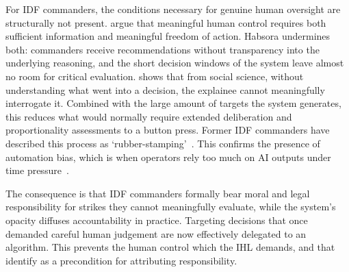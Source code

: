 For IDF commanders, the conditions necessary for genuine human oversight are structurally not present. \citet{mhcof} argue that meaningful human control requires both sufficient information and meaningful freedom of action. Habsora undermines both: commanders receive recommendations without transparency into the underlying reasoning, and the short decision windows of the system leave almost no room for critical evaluation. \citet{miller2018explanationartificialintelligenceinsights} shows that from social science, without understanding what went into a decision, the explainee cannot meaningfully interrogate it. Combined with the large amount of targets the system generates, this reduces what would normally require extended deliberation and proportionality assessments to a button press. Former IDF commanders have described this process as `rubber-stamping'~\citep{kozlovski2024algorithms}. This confirms the presence of automation bias, which is when operators rely too much on AI outputs under time pressure~\citep{parasuraman2010complacency}.

The consequence is that IDF commanders formally bear moral and legal responsibility for strikes they cannot meaningfully evaluate, while the system's opacity diffuses accountability in practice. Targeting decisions that once demanded careful human judgement are now effectively delegated to an algorithm. This prevents the human control which the IHL demands, and that \citet{mhcof} identify as a precondition for attributing responsibility.
